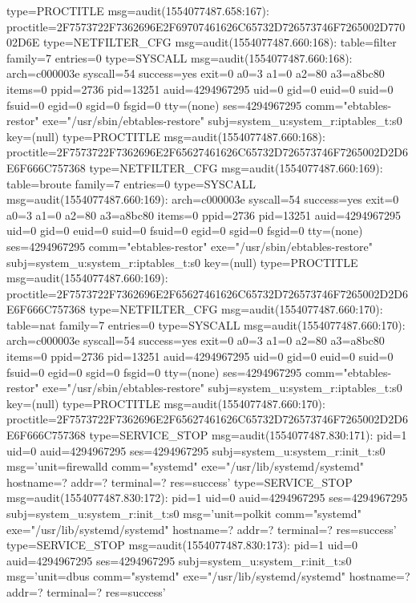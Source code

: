 \documentclass[]{report}
\newenvironment{Shaded}{}{}
\newcommand{\NormalTok}[1]{#1}
\begin{document}
\begin{Shaded}
\begin{Highlighting}[]
\NormalTok{type=PROCTITLE msg=audit(1554077487.658:167): proctitle=2F7573722F7362696E2F69707461626C65732D726573746F7265002D77002D6E}
\NormalTok{type=NETFILTER_CFG msg=audit(1554077487.660:168): table=filter family=7 entries=0}
\NormalTok{type=SYSCALL msg=audit(1554077487.660:168): arch=c000003e syscall=54 success=yes exit=0 a0=3 a1=0 a2=80 a3=a8bc80 items=0 ppid=2736 pid=13251 auid=4294967295 uid=0 gid=0 euid=0 suid=0 fsuid=0 egid=0 sgid=0 fsgid=0 tty=(none) ses=4294967295 comm="ebtables-restor" exe="/usr/sbin/ebtables-restore" subj=system_u:system_r:iptables_t:s0 key=(null)}
\NormalTok{type=PROCTITLE msg=audit(1554077487.660:168): proctitle=2F7573722F7362696E2F65627461626C65732D726573746F7265002D2D6E6F666C757368}
\NormalTok{type=NETFILTER_CFG msg=audit(1554077487.660:169): table=broute family=7 entries=0}
\NormalTok{type=SYSCALL msg=audit(1554077487.660:169): arch=c000003e syscall=54 success=yes exit=0 a0=3 a1=0 a2=80 a3=a8bc80 items=0 ppid=2736 pid=13251 auid=4294967295 uid=0 gid=0 euid=0 suid=0 fsuid=0 egid=0 sgid=0 fsgid=0 tty=(none) ses=4294967295 comm="ebtables-restor" exe="/usr/sbin/ebtables-restore" subj=system_u:system_r:iptables_t:s0 key=(null)}
\NormalTok{type=PROCTITLE msg=audit(1554077487.660:169): proctitle=2F7573722F7362696E2F65627461626C65732D726573746F7265002D2D6E6F666C757368}
\NormalTok{type=NETFILTER_CFG msg=audit(1554077487.660:170): table=nat family=7 entries=0}
\NormalTok{type=SYSCALL msg=audit(1554077487.660:170): arch=c000003e syscall=54 success=yes exit=0 a0=3 a1=0 a2=80 a3=a8bc80 items=0 ppid=2736 pid=13251 auid=4294967295 uid=0 gid=0 euid=0 suid=0 fsuid=0 egid=0 sgid=0 fsgid=0 tty=(none) ses=4294967295 comm="ebtables-restor" exe="/usr/sbin/ebtables-restore" subj=system_u:system_r:iptables_t:s0 key=(null)}
\NormalTok{type=PROCTITLE msg=audit(1554077487.660:170): proctitle=2F7573722F7362696E2F65627461626C65732D726573746F7265002D2D6E6F666C757368}
\NormalTok{type=SERVICE_STOP msg=audit(1554077487.830:171): pid=1 uid=0 auid=4294967295 ses=4294967295 subj=system_u:system_r:init_t:s0 msg='unit=firewalld comm="systemd" exe="/usr/lib/systemd/systemd" hostname=? addr=? terminal=? res=success'}
\NormalTok{type=SERVICE_STOP msg=audit(1554077487.830:172): pid=1 uid=0 auid=4294967295 ses=4294967295 subj=system_u:system_r:init_t:s0 msg='unit=polkit comm="systemd" exe="/usr/lib/systemd/systemd" hostname=? addr=? terminal=? res=success'}
\NormalTok{type=SERVICE_STOP msg=audit(1554077487.830:173): pid=1 uid=0 auid=4294967295 ses=4294967295 subj=system_u:system_r:init_t:s0 msg='unit=dbus comm="systemd" exe="/usr/lib/systemd/systemd" hostname=? addr=? terminal=? res=success'}

\end{Highlighting}
\end{Shaded}
\end{document}
